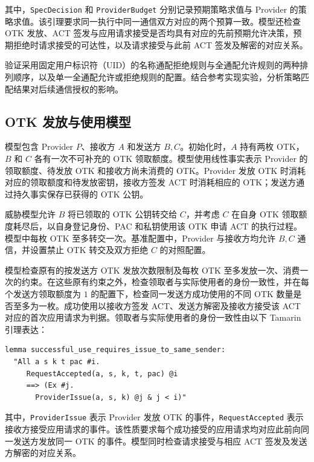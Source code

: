 其中，\texttt{SpecDecision} 和 \texttt{ProviderBudget} 分别记录预期策略求值与 Provider 的策略求值。该引理要求同一执行中同一通信双方对应的两个预算一致。模型还检查 OTK 发放、ACT 签发与应用请求接受是否均具有对应的先前预期允许决策，预期拒绝时请求接受的可达性，以及请求接受与此前 ACT 签发及解密的对应关系。

验证采用固定用户标识符（UID）的名称通配拒绝规则与全通配允许规则的两种排列顺序，以及单一全通配允许或拒绝规则的配置。结合参考实现实验，分析策略匹配结果对后续通信授权的影响。

\subsection{OTK 发放与使用模型}
\label{subsec:otk-issuance-use-model}

模型包含 Provider $P$、接收方 $A$ 和发送方 $B,C$。初始化时，$A$ 持有两枚 OTK，$B$ 和 $C$ 各有一次不可补充的 OTK 领取额度。模型使用线性事实表示 Provider 的领取额度、待发放 OTK 和接收方尚未消费的 OTK。Provider 发放 OTK 时消耗对应的领取额度和待发放密钥，接收方签发 ACT 时消耗相应的 OTK；发送方通过持久事实保存已获得的 OTK 公钥。

威胁模型允许 $B$ 将已领取的 OTK 公钥转交给 $C$，并考虑 $C$ 在自身 OTK 领取额度耗尽后，以自身登记身份、PAC 和私钥使用该 OTK 申请 ACT 的执行过程。模型中每枚 OTK 至多转交一次。基准配置中，Provider 与接收方均允许 $B,C$ 通信，并设置禁止 OTK 转交及双方拒绝 $C$ 的对照配置。

模型检查原有的按发送方 OTK 发放次数限制及每枚 OTK 至多发放一次、消费一次的约束。在这些原有约束之外，检查领取者与实际使用者的身份一致性，并在每个发送方领取额度为 $1$ 的配置下，检查同一发送方成功使用的不同 OTK 数量是否至多为一枚。成功使用以接收方签发 ACT、发送方解密及接收方接受该 ACT 对应的首次应用请求为判据。领取者与实际使用者的身份一致性由以下 Tamarin 引理表达：

\begingroup
\renewcommand{\verbatimsize}{\footnotesize}
\setlength{\verbatimbaselineskip}{10pt}
\noindent\begin{minipage}{\linewidth}
\begin{verbatim}
lemma successful_use_requires_issue_to_same_sender:
  "All a s k t pac #i.
     RequestAccepted(a, s, k, t, pac) @i
     ==> (Ex #j.
       ProviderIssue(a, s, k) @j & j < i)"
\end{verbatim}
\end{minipage}
\endgroup

其中，\texttt{ProviderIssue} 表示 Provider 发放 OTK 的事件，\texttt{RequestAccepted} 表示接收方接受应用请求的事件。该性质要求每个成功接受的应用请求均对应此前向同一发送方发放同一 OTK 的事件。模型同时检查请求接受与相应 ACT 签发及发送方解密的对应关系。

